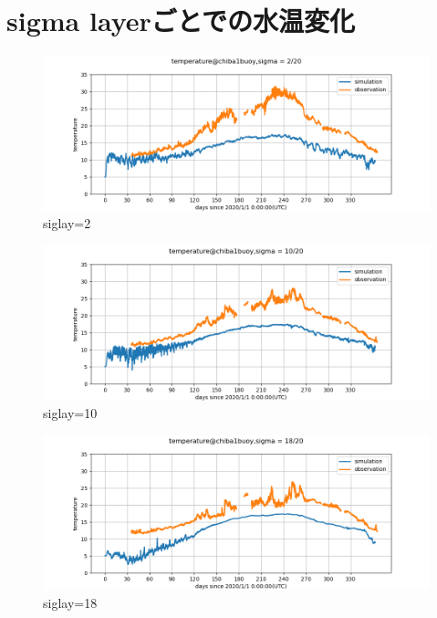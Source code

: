 \documentclass[12pt,a4paper]{jarticle}
\begin{document}
\section{sigma layerごとでの水温変化}
\begin{figure}[hbtp]
    \centering
        \includegraphics[keepaspectratio,scale=0.5]{Tokyo4/temperature_chiba1buoy_2_Tokyo4.png}
    \caption{siglay=2}
\end{figure}

\begin{figure}[hbtp]
    \centering
        \includegraphics[keepaspectratio,scale=0.5]{Tokyo4/temperature_chiba1buoy_10_Tokyo4.png}
    \caption{siglay=10}
\end{figure}

\begin{figure}[hbtp]
    \centering
        \includegraphics[keepaspectratio,scale=0.5]{Tokyo4/temperature_chiba1buoy_18_Tokyo4.png}
    \caption{siglay=18}
\end{figure}

        
\end{document}
